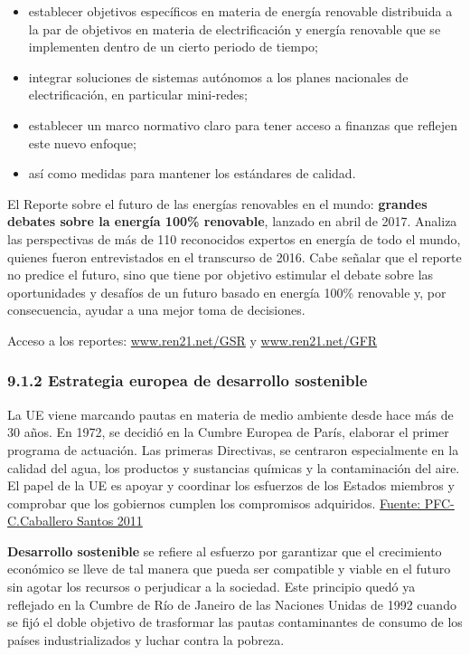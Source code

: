 \begin{itemize}
\item
  establecer objetivos específicos en materia de energía renovable
  distribuida a la par de objetivos en materia de electrificación y
  energía renovable que se implementen dentro de un cierto periodo de
  tiempo; 
\item
  integrar soluciones de sistemas autónomos a los planes nacionales de
  electrificación, en particular mini-redes; 
\item
  establecer un marco normativo claro para tener acceso a finanzas que
  reflejen este nuevo enfoque; 
\item
  así como medidas para mantener los estándares de calidad.
\end{itemize}

El Reporte sobre el futuro de las energías renovables en el mundo:
\textbf{grandes debates sobre la energía 100\% renovable}, lanzado en
abril de 2017. Analiza las perspectivas de más de 110 reconocidos
expertos en energía de todo el mundo, quienes fueron entrevistados en el
transcurso de 2016. Cabe señalar que el reporte no predice el futuro,
sino que tiene por objetivo estimular el debate sobre las oportunidades
y desafíos de un futuro basado en energía 100\% renovable y, por
consecuencia, ayudar a una mejor toma de decisiones.

Acceso a los reportes: \url{www.ren21.net/GSR} y \url{www.ren21.net/GFR}

\subsubsection{9.1.2 Estrategia europea de desarrollo
sostenible}\label{header-n72}

La UE viene marcando pautas en materia de medio ambiente desde hace más
de 30 años. En 1972, se decidió en la Cumbre Europea de París, elaborar
el primer programa de actuación. Las primeras Directivas, se centraron
especialmente en la calidad del agua, los productos y sustancias
químicas y la contaminación del aire. El papel de la UE es apoyar y
coordinar los esfuerzos de los Estados miembros y comprobar que los
gobiernos cumplen los compromisos adquiridos.
\href{https://e-archivo.uc3m.es/bitstream/handle/10016/12153/PFC_Carlos_\%20Caballero_Santos.pdf?sequence=1}{Fuente:
PFC-C.Caballero Santos 2011}

\textbf{Desarrollo sostenible} se refiere al esfuerzo por garantizar que
el crecimiento económico se lleve de tal manera que pueda ser compatible
y viable en el futuro sin agotar los recursos o perjudicar a la
sociedad. Este principio quedó ya reflejado en la Cumbre de Río de
Janeiro de las Naciones Unidas de 1992 cuando se fijó el doble objetivo
de trasformar las pautas contaminantes de consumo de los países
industrializados y luchar contra la pobreza.


